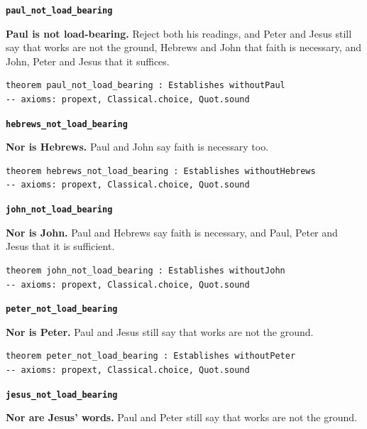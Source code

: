 \documentclass[11pt,paper=\testimonypaper,DIV=13,parskip=false]{scrartcl}
\begin{document}
\par\medskip\noindent\textbf{\texttt{paul\_\allowbreak{}not\_\allowbreak{}load\_\allowbreak{}bearing}}\par\nobreak\noindent
\textbf{Paul is not load-bearing.} Reject both his readings, and Peter and Jesus still say that works are not the ground, Hebrews and John that faith is necessary, and John, Peter and Jesus that it suffices.

{\small\begin{verbatim}
theorem paul_not_load_bearing : Establishes withoutPaul
-- axioms: propext, Classical.choice, Quot.sound
\end{verbatim}}
\par\medskip\noindent\textbf{\texttt{hebrews\_\allowbreak{}not\_\allowbreak{}load\_\allowbreak{}bearing}}\par\nobreak\noindent
\textbf{Nor is Hebrews.} Paul and John say faith is necessary too.

{\small\begin{verbatim}
theorem hebrews_not_load_bearing : Establishes withoutHebrews
-- axioms: propext, Classical.choice, Quot.sound
\end{verbatim}}
\par\medskip\noindent\textbf{\texttt{john\_\allowbreak{}not\_\allowbreak{}load\_\allowbreak{}bearing}}\par\nobreak\noindent
\textbf{Nor is John.} Paul and Hebrews say faith is necessary, and Paul, Peter and Jesus that it is sufficient.

{\small\begin{verbatim}
theorem john_not_load_bearing : Establishes withoutJohn
-- axioms: propext, Classical.choice, Quot.sound
\end{verbatim}}
\par\medskip\noindent\textbf{\texttt{peter\_\allowbreak{}not\_\allowbreak{}load\_\allowbreak{}bearing}}\par\nobreak\noindent
\textbf{Nor is Peter.} Paul and Jesus still say that works are not the ground.

{\small\begin{verbatim}
theorem peter_not_load_bearing : Establishes withoutPeter
-- axioms: propext, Classical.choice, Quot.sound
\end{verbatim}}
\par\medskip\noindent\textbf{\texttt{jesus\_\allowbreak{}not\_\allowbreak{}load\_\allowbreak{}bearing}}\par\nobreak\noindent
\textbf{Nor are Jesus’ words.} Paul and Peter still say that works are not the ground.
\end{document}
